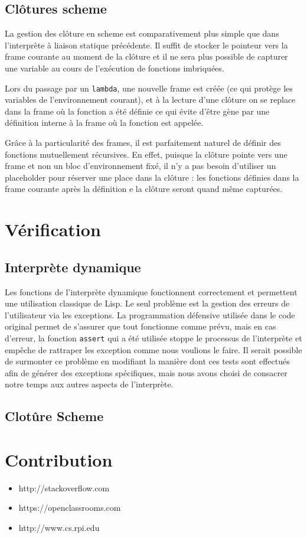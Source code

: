 \documentclass[a4paper,11pt]{article}
\begin{document}
\subsection{Clôtures scheme}

La gestion des clôture en scheme est comparativement plus simple que dans
l'interprète à liaison statique précédente. Il suffit de stocker le pointeur
vers la frame courante au moment de la clôture et il ne sera plus possible de
capturer une variable au cours de l'exécution de fonctions imbriquées.

Lors du passage par un \texttt{lambda}, une nouvelle frame est créée (ce qui
protège les variables de l'environnement courant), et à la lecture d'une clôture
on se replace dans la frame où la fonction a été définie ce qui évite d'être
gène par une définition interne à la frame où la fonction est appelée.

Grâce à la particularité des frames, il est parfaitement naturel de définir des
fonctions mutuellement récursives. En effet, puisque la clôture pointe vers une
frame et non un bloc d'environnement fixé, il n'y a pas besoin d'utiliser un
placeholder pour réserver une place dans la clôture : les fonctions définies
dans la frame courante après la définition e la clôture seront quand même
capturées.

\section{Vérification}
 
 \subsection{Interprète dynamique}
 Les fonctions de l'interprète dynamique fonctionnent correctement et permettent 
 une utilisation classique de Lisp.  
 Le seul problème est la gestion des erreurs de 
 l'utilisateur via les exceptions. La programmation défensive utilisée dans le 
 code original permet de s'assurer que tout fonctionne comme prévu, mais en cas 
 d'erreur, la fonction \texttt{assert} qui a été utilisée stoppe le processus de 
 l'interprète et empêche de rattraper les exception comme nous voulions le faire.
 Il serait possible de surmonter ce problème en modifiant la manière dont ces 
 tests sont effectués afin de générer des exceptions spécifiques, mais nous avons 
 choisi de consacrer notre temps aux autres aspects de l'interprète.
 
 \subsection{Clotûre Scheme}


\section{Contribution}




\begin{itemize}
\item http://stackoverflow.com
\item https://openclassrooms.com
\item http://www.cs.rpi.edu
\end{itemize}
\end{document}
